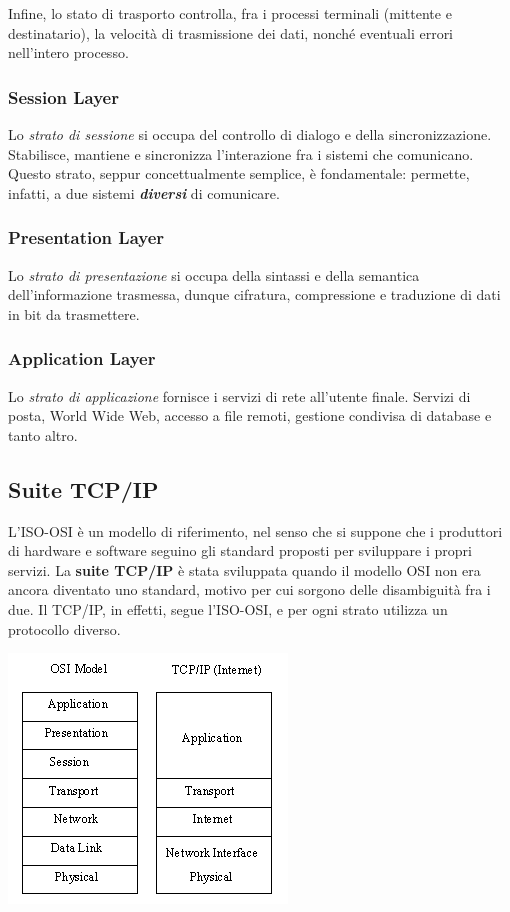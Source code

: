             Infine, lo stato di trasporto controlla, fra i processi terminali (mittente e destinatario), la velocità di trasmissione dei dati, nonché eventuali errori nell'intero processo.
        
        \subsubsection{Session Layer}
        
            Lo \textit{strato di sessione} si occupa del controllo di dialogo e della sincronizzazione. Stabilisce, mantiene e sincronizza l'interazione fra i sistemi che comunicano. Questo strato, seppur concettualmente semplice, è fondamentale: permette, infatti, a due sistemi \textit{\textbf{diversi}} di comunicare.
        
        \subsubsection{Presentation Layer}
        
            Lo \textit{strato di presentazione} si occupa della sintassi e della semantica dell'informazione trasmessa, dunque cifratura, compressione e traduzione di dati in bit da trasmettere.
        
        \subsubsection{Application Layer}
        
            Lo \textit{strato di applicazione} fornisce i servizi di rete all'utente finale. Servizi di posta, World Wide Web, accesso a file remoti, gestione condivisa di database e tanto altro.
            
    \subsection{Suite TCP/IP}
        L'ISO-OSI è un modello di riferimento, nel senso che si suppone che i produttori di hardware e software seguino gli standard proposti per sviluppare i propri servizi. La \textbf{suite TCP/IP} è stata sviluppata quando il modello OSI non era ancora diventato uno standard, motivo per cui sorgono delle disambiguità fra i due. Il TCP/IP, in effetti, segue l'ISO-OSI, e per ogni strato utilizza un protocollo diverso.
    
        \begin{center}
            \includegraphics{images/TCP.png}
        \end{center}
    
